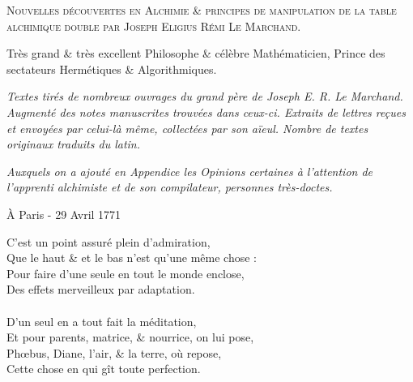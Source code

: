 \newpage

\thispagestyle{empty}

\newlength{\savedparindent}
\setlength{\savedparindent}{\parindent}

\setlength{\parindent}{-4em}


\fontsize{25pt}{25pt}\selectfont{}
\begin{center}
\textsc{Nouvelles découvertes en Alchimie \& principes de manipulation de la
table alchimique double par Joseph Eligius Rémi Le Marchand.}

\vspace*{1cm}

\fontsize{20pt}{20pt}\selectfont{}
Très grand \& très excellent Philosophe \& célèbre Mathématicien, Prince des
sectateurs Hermétiques \& Algorithmiques.

\vspace*{1cm}

\textit{Textes tirés de nombreux ouvrages du grand père de Joseph E. R. Le
    Marchand.
Augmenté des notes manuscrites trouvées dans ceux-ci.  Extraits de lettres
reçues et envoyées par celui-là même, collectées par son aïeul.  Nombre de
textes originaux traduits du latin.  }

\textit{Auxquels on a ajouté en Appendice les Opinions certaines à l'attention
de l'apprenti alchimiste et de son compilateur, personnes très-doctes.}
\end{center}
\setlength{\parindent}{\savedparindent}

\fontsize{15pt}{15pt}\selectfont{}
\begin{flushright}
À Paris - 29 Avril 1771
\end{flushright}

\newpage

\normalsize


\noindent{}C'est un point assuré plein d'admiration,\\
Que le haut \& et le bas n'est qu'une même chose :\\
Pour faire d'une seule en tout le monde enclose,\\
Des effets merveilleux par adaptation.\\
\\
D'un seul en a tout fait la méditation,\\
Et pour parents, matrice, \& nourrice, on lui pose,\\
Phœbus, Diane, l'air, \& la terre, où repose,\\
Cette chose en qui gît toute perfection.\\

